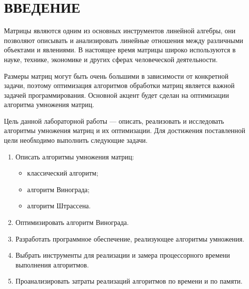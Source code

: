 \chapter*{ВВЕДЕНИЕ}

Матрицы являются одним из основных инструментов линейной алгебры, они позволяют описывать и анализировать линейные отношения между различными объектами и явлениями. В настоящее время матрицы широко используются в науке, технике, экономике и других сферах человеческой деятельности.

Размеры матриц могут быть очень большими в зависимости от конкретной задачи, поэтому оптимизация алгоритмов обработки матриц является важной задачей программирования. Основной акцент будет сделан на оптимизации алгоритма умножения матриц.

Цель данной лабораторной работы --- описать, реализовать и исследовать алгоритмы умножения матриц и их оптимизации.
Для достижения поставленной цели необходимо выполнить следующие задачи.
\begin{enumerate}
	\item Описать алгоритмы умножения матриц: 
	\begin{itemize}
		\item классический алгоритм;
		\item алгоритм Винограда;
		\item алгоритм Штрассена.
	\end{itemize}
	\item Оптимизировать алгоритм Винограда.
	\item Разработать программное обеспечение, реализующее алгоритмы умножения.
	\item Выбрать инструменты для реализации и замера процессорного времени
	выполнения алгоритмов.
	\item Проанализировать затраты реализаций алгоритмов по времени и по памяти.
\end{enumerate}


